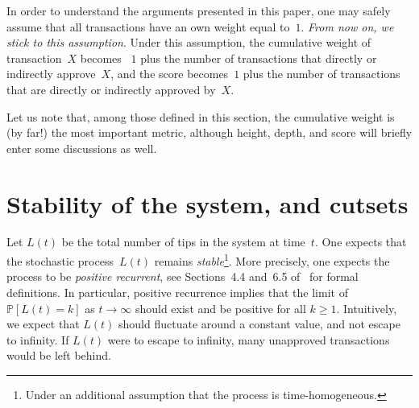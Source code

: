 \documentclass[12pt]{article}
\newcommand{\IP}{\mathbb{P}}
\begin{document}
\begin{CJK}{UTF8}{bkai}
In order to understand the arguments presented in this paper,
one may safely assume that all transactions have an own weight
 equal to~$1$.  
\emph{From now on, we stick to this assumption}.
Under this assumption, the cumulative weight of 
transaction~$X$ becomes
~$1$ plus the number of transactions that directly or 
indirectly approve~$X$, and 
the score 
becomes~$1$ plus the number of transactions
that are directly or indirectly approved by~$X$. 

Let us note that, among those defined 
in this section, the cumulative weight
is (by far!) the most important metric, although 
height, depth, and score will 
briefly enter some discussions as well.




\section{Stability of the system, and cutsets}
\label{s_cutsets}

Let $L(t)$ be the total number of tips 
in the system at time~$t$. One
 expects that 
the stochastic process~$L(t)$ remains \emph{stable}\footnote{Under
an additional assumption that the process is time-homogeneous.}.
More precisely, one expects the process to be \emph{positive recurrent}, see Sections~4.4 and~6.5
of~\cite{Ross_m} for formal definitions. 
In particular, positive recurrence implies that the limit of 
$\IP[L(t)=k]$ as $t\to \infty$ should
exist and be positive for all $k\geq 1$. 
Intuitively, we expect that $L(t)$ should fluctuate 
around a constant value, and not escape to infinity.
If $L(t)$ were to escape to infinity, many unapproved transactions
would be left behind.


\end{CJK}
\end{document}
